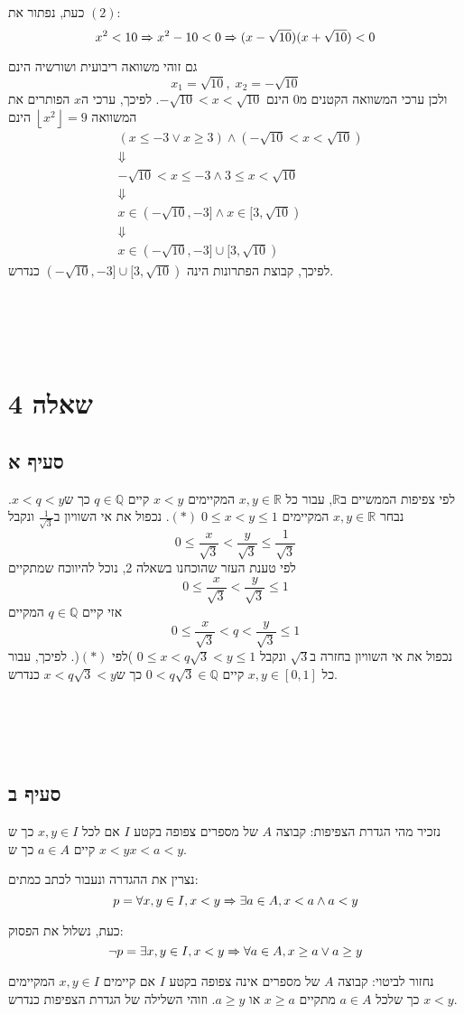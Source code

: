 \documentclass[11pt, oneside]{article}
\newcommand{\qed}{\R{$\blacksquare$}}
\newcommand{\br}{\\\\\\\\\\}
\newcommand{\logr}[1]{\xRightarrow[\text{#1}]{}}
\newcommand{\mR}{\mathbb{R}}
\newcommand{\mQ}{\mathbb{Q}}
\newcommand{\floor}[1]{\left\lfloor {#1} \right\rfloor}
\begin{document}
כעת, נפתור את $(2)$:
\[
x^2 < 10 \logr{} x^2 - 10 < 0 \logr{} (x - \sqrt{10})(x + \sqrt{10}) < 0
\]
גם זוהי משוואה ריבועית ושורשיה הינם
\[x_1 = \sqrt{10},\;x_2 = -\sqrt{10}\]
ולכן ערכי המשוואה הקטנים מ$0$ הינם $-\sqrt{10} < x < \sqrt{10}$. לפיכך, ערכי ה$x$ הפותרים את המשוואה $\floor{x^2} = 9$ הינם
\begin{eqnarray*}
& (x \le -3 \lor x \ge 3) \land (-\sqrt{10} < x < \sqrt{10})\\
& \Downarrow\\
& -\sqrt{10} < x \le -3 \land 3 \le x < \sqrt{10}\\
& \Downarrow\\
& x \in (-\sqrt{10}, -3] \land x \in [3, \sqrt{10})\\
& \Downarrow\\
& x \in (-\sqrt{10}, -3] \cup [3, \sqrt{10})
\end{eqnarray*}
לפיכך, קבוצת הפתרונות הינה $(-\sqrt{10}, -3] \cup [3, \sqrt{10})$ כנדרש.
\br\qed
\clearpage

\section{שאלה 4}
\subsection{סעיף א}
לפי צפיפות הממשיים ב$\mR$, עבור כל $x, y \in \mR$ המקיימים $x < y$ קיים $q \in \mQ$ כך ש$x < q < y$. נבחר $x, y \in \mR$ המקיימים $(*)\;0 \le x < y \le 1$. נכפול את אי השוויון ב$\frac{1}{\sqrt{3}}$ ונקבל
\[
0 \le \frac{x}{\sqrt{3}} < \frac{y}{\sqrt{3}} \le \frac{1}{\sqrt{3}}
\]
לפי טענת העזר שהוכחנו בשאלה 2, נוכל להיווכח שמתקיים
\[
0 \le \frac{x}{\sqrt{3}} < \frac{y}{\sqrt{3}} \le 1
\]
אזי קיים $q \in \mQ$ המקיים
\[
0 \le \frac{x}{\sqrt{3}} < q < \frac{y}{\sqrt{3}} \le 1
\]
נכפול את אי השוויון בחזרה ב$\sqrt{3}$ ונקבל $0 \le x < q\sqrt{3} < y \le 1$ )לפי $(*)$(. לפיכך, עבור כל $x, y \in [0, 1]$ קיים $0 < q\sqrt{3} \in \mQ$ כך ש$x < q\sqrt{3} < y$ כנדרש.
\br\qed

\subsection{סעיף ב}
נזכיר מהי הגדרת הצפיפות: קבוצה $A$ של מספרים צפופה בקטע $I$ אם לכל $x, y \in I$ כך ש$x < y$ קיים $a \in A$ כך ש$x < a < y$.

נצרין את ההגדרה ונעבור לכתב כמתים:
\[
p = \forall x, y \in I, x < y \logr{} \exists a \in A, x < a \land a < y
\]
כעת, נשלול את הפסוק:
\[
\neg p = \exists x, y \in I, x < y \logr{} \forall a \in A, x \ge a \lor a \ge y
\]
נחזור לביטוי: קבוצה $A$ של מספרים אינה צפופה בקטע $I$ אם קיימים $x, y \in I$ המקיימים $x < y$ כך שלכל $a \in A$ מתקיים $x \ge a$ או $a \ge y$. וזוהי השלילה של הגדרת הצפיפות כנדרש.
\br\qed
\end{document}
